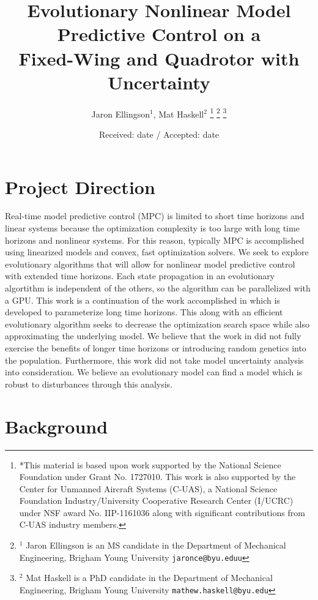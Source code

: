 \documentclass[letterpaper, 10 pt, conference]{ieeeconf}  %
\title{\LARGE \bf
	Evolutionary Nonlinear Model Predictive Control on a \\ Fixed-Wing and Quadrotor with Uncertainty
}
\author{Jaron Ellingson$^{1}$, Mat Haskell$^{2}$%
	\thanks{*This material is based upon work supported by the National Science Foundation under Grant No. 1727010. This work is also supported by the Center for Unmanned Aircraft Systems (C-UAS), a National Science Foundation Industry/University Cooperative Research Center (I/UCRC) under NSF award No. IIP-1161036 along with significant contributions from C-UAS industry members.}%
	\thanks{$^{1}$ Jaron Ellingson is an MS candidate in the Department of Mechanical Engineering, Brigham Young University
		{\tt\small jaronce@byu.eduu}}%
	\thanks{$^{2}$ Mat Haskell is a PhD candidate in the Department of Mechanical Engineering, Brigham Young University
		{\tt\small mathew.haskell@byu.edu}}%
}
\begin{document}
\maketitle
\thispagestyle{empty}
\pagestyle{empty}

\date{Received: date / Accepted: date}


\maketitle



\section{Project Direction}

Real-time model predictive control (MPC) is limited to short time horizons and linear systems because the optimization complexity is too large with long time horizons and nonlinear systems. For this reason, typically MPC is accomplished using linearized models and convex, fast optimization solvers. We seek to explore evolutionary algorithms that will allow for nonlinear model predictive control with extended time horizons. Each state propagation in an evolutionary algortithm is independent of the others, so the algorithm can be parallelized with a GPU. This work is a continuation of the work accomplished in \cite{hyatt2020parameterized} which is developed to parameterize long time horizons. 
This along with an efficient evolutionary algorithm seeks to decrease the optimization search space while also approximating the underlying model. %
We believe that the work in \cite{hyatt2020parameterized} did not fully exercise the benefits of longer time horizons %
or introducing random genetics into the population. Furthermore, this work did not take model uncertainty analysis into consideration. We believe an evolutionary model can find a model which is robust to disturbances through this analysis. 	


\section{Background}
\end{document}
